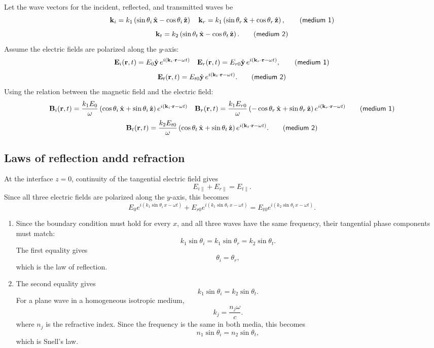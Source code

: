 \documentclass[10pt,a4paper]{article}
\begin{document}
Let the wave vectors for the incident, reflected, and transmitted waves be
\[
\mathbf{k}_i
= k_1\left(\sin\theta_i\,\hat{\mathbf{x}}
          -\cos\theta_i\,\hat{\mathbf{z}}\right)
\quad
\mathbf{k}_r
= k_1\left(\sin\theta_r\,\hat{\mathbf{x}}
          +\cos\theta_r\,\hat{\mathbf{z}}\right),
\tag{\textsf{medium 1}}
\]
\[
\mathbf{k}_t
= k_2\left(\sin\theta_t\,\hat{\mathbf{x}}
          -\cos\theta_t\,\hat{\mathbf{z}}\right).
\tag{\textsf{medium 2}}
\]
Assume the electric fields are polarized along the \(y\)-axis:
\[
\mathbf{E}_i(\mathbf{r},t)
= E_0\hat{\mathbf{y}}\,
   e^{i(\mathbf{k}_i\cdot\mathbf{r}-\omega t)}
\quad
\mathbf{E}_r(\mathbf{r},t)
= E_{r0}\hat{\mathbf{y}}\,
   e^{i(\mathbf{k}_r\cdot\mathbf{r}-\omega t)},
\tag{\textsf{medium 1}}
\]
\[
\mathbf{E}_t(\mathbf{r},t)
= E_{t0}\hat{\mathbf{y}}\,
   e^{i(\mathbf{k}_t\cdot\mathbf{r}-\omega t)}.
\tag{\textsf{medium 2}}
\]
Using the relation between the magnetic field and the electric field:
\[
\mathbf{B}_i(\mathbf{r},t)
= \frac{k_1E_0}{\omega}
   \left(\cos\theta_i\,\hat{\mathbf{x}}
        +\sin\theta_i\,\hat{\mathbf{z}}\right)
   e^{i(\mathbf{k}_i\cdot\mathbf{r}-\omega t)}
\quad
\mathbf{B}_r(\mathbf{r},t)
= \frac{k_1E_{r0}}{\omega}
   \left(-\cos\theta_r\,\hat{\mathbf{x}}
        +\sin\theta_r\,\hat{\mathbf{z}}\right)
   e^{i(\mathbf{k}_r\cdot\mathbf{r}-\omega t)}
\tag{\textsf{medium 1}}
\]
\[
\mathbf{B}_t(\mathbf{r},t)
= \frac{k_2E_{t0}}{\omega}
   \left(\cos\theta_t\,\hat{\mathbf{x}}
        +\sin\theta_t\,\hat{\mathbf{z}}\right)
   e^{i(\mathbf{k}_t\cdot\mathbf{r}-\omega t)}.
\tag{\textsf{medium 2}}
\]

\subsection{Laws of reflection andd refraction}
At the interface \(z=0\), continuity of the tangential electric field gives
\[
E_{i\parallel}+E_{r\parallel}=E_{t\parallel}.
\]
Since all three electric fields are polarized along the \(y\)-axis, this becomes
\[
E_0 e^{i(k_1\sin\theta_i\,x-\omega t)}
+
E_{r0} e^{i(k_1\sin\theta_r\,x-\omega t)}
=
E_{t0} e^{i(k_2\sin\theta_t\,x-\omega t)}.
\]

\begin{enumerate}
    \item Since the boundary condition must hold for every \(x\), and all
    three waves have the same frequency, their tangential phase components
    must match:
    \[
        k_1\sin\theta_i
        =
        k_1\sin\theta_r
        =
        k_2\sin\theta_t.
    \]
    The first equality gives
    \[
        \theta_i=\theta_r,
    \]
    which is the \textcolor{red!70!black}{\textsf{law of reflection}}.

    \item The second equality gives
    \[
        k_1\sin\theta_i=k_2\sin\theta_t.
    \]
    For a plane wave in a
    \textcolor{red!70!black}{\textsf{homogeneous isotropic medium}},
    \[
        k_j=\frac{n_j\omega}{c}.
    \]
    where \(n_j\) is the refractive index. Since the frequency is the same in both media, this becomes
    \[
        n_1\sin\theta_i=n_2\sin\theta_t,
    \]
    which is Snell's law.
\end{enumerate}
\end{document}
